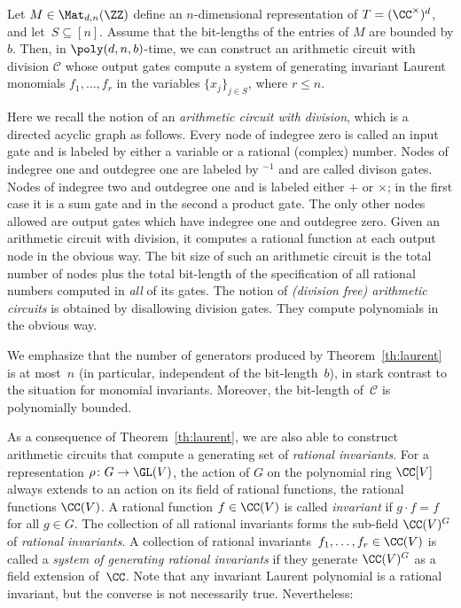 \begin{theorem}\label{th:laurent}
Let $M \in\Mat_{d,n}(\ZZ)$ define an $n$-dimensional representation of $T = (\CC^\times)^d$, and let~$S \subseteq [n]$.
Assume that the bit-lengths of the entries of $M$ are bounded by $b$.
Then, in $\poly(d,n,b)$-time, we can construct an arithmetic circuit with division $\mathcal{C}$ whose output gates compute a system of generating invariant Laurent monomials $f_1,\dots,f_r$ in the variables $\{x_j\}_{j\in S}$, where $r \leq n$.
\end{theorem}

Here we recall the notion of an \emph{arithmetic circuit with division}, which is a directed acyclic graph as follows.
Every node of indegree zero is called an input gate and is labeled by either a variable or a rational (complex) number.
Nodes of indegree one and outdegree one are labeled by $^{-1}$ and are called divison gates.
Nodes of indegree two and outdegree one and is labeled either $+$ or $\times$; in the first case it is a sum gate and in the second a product gate.
The only other nodes allowed are output gates which have indegree one and outdegree zero. Given an arithmetic circuit with division,
it computes a rational function at each output node in the obvious way. The bit size of such an arithmetic circuit is
the total number of nodes plus the total bit-length of the specification of all rational numbers computed in {\em all} of its gates.
The notion of {\em (division free) arithmetic circuits} is obtained by disallowing division gates.
They compute polynomials in the obvious way.

We emphasize that the number of generators produced by Theorem~\ref{th:laurent} is at most~$n$ (in particular, independent of the bit-length~$b$), in stark contrast to the situation for monomial invariants.
Moreover, the bit-length of~$\mathcal{C}$ is polynomially bounded.

As a consequence of Theorem~\ref{th:laurent}, we are also able to construct arithmetic circuits that compute a generating set of \emph{rational invariants}.
For a representation $\rho\colon G \rightarrow \GL(V)$, the action of $G$ on the polynomial ring $\CC[V]$ always extends to an action on its field of rational functions, the rational functions $\CC(V)$.
A rational function $f \in \CC(V)$ is called \emph{invariant} if $g \cdot f = f$ for all $g \in G$.
The collection of all rational invariants forms the sub-field $\CC(V)^G$ of \emph{rational invariants}.
A collection of rational invariants~$f_1,\dots,f_r \in \CC(V)$ is called a \emph{system of generating rational invariants} if they generate $\CC(V)^G$ as a field extension of~$\CC$.
Note that any invariant Laurent polynomial is a rational invariant, but the converse is not necessarily true.
Nevertheless:

